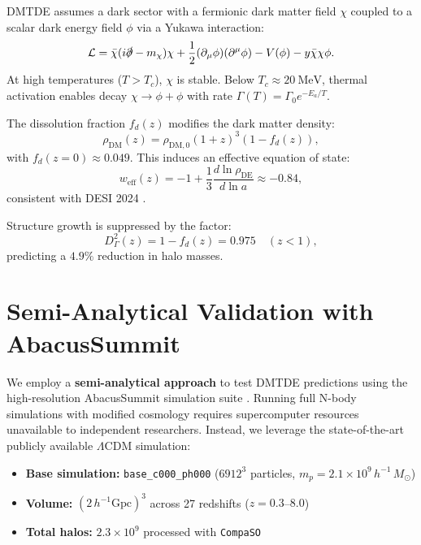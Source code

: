 \documentclass[aps,prd,twocolumn,superscriptaddress,nofootinbib,floatfix,preprintnumbers]{revtex4-2}
\newcommand{\DMTDE}{\textsc{DMTDE}\xspace}
\newcommand{\LCDM}{\ensuremath{\Lambda\text{CDM}}\xspace}
\newcommand{\Msun}{\ensuremath{M_\odot}\xspace}
\begin{document}
\DMTDE assumes a dark sector with a fermionic dark matter field $\chi$ coupled to a scalar dark energy field $\phi$ via a Yukawa interaction:
\begin{equation}
\mathcal{L} = \bar{\chi}(i\slashed{\partial} - m_\chi)\chi + \frac{1}{2}(\partial_\mu\phi)(\partial^\mu\phi) - V(\phi) - y\bar{\chi}\chi\phi.
\end{equation}
At high temperatures ($T > T_c$), $\chi$ is stable. Below $T_c \approx \SI{20}{\MeV}$, thermal activation enables decay $\chi \to \phi + \phi$ with rate $\Gamma(T) = \Gamma_0 e^{-E_a/T}$.

The dissolution fraction $f_d(z)$ modifies the dark matter density:
\begin{equation}
\rho_\mathrm{DM}(z) = \rho_\mathrm{DM,0} (1+z)^3 (1 - f_d(z)),
\end{equation}
with $f_d(z=0) \approx 0.049$. This induces an effective equation of state:
\begin{equation}
w_{\mathrm{eff}}(z) = -1 + \frac{1}{3}\frac{d \ln \rho_\mathrm{DE}}{d \ln a} \approx -0.84,
\end{equation}
consistent with DESI 2024 \citep{DESI2024}.

Structure growth is suppressed by the factor:
\begin{equation}
D_\Gamma^2(z) = 1 - f_d(z) = 0.975 \quad (z < 1),
\end{equation}
predicting a $4.9\%$ reduction in halo masses.

\newpage
\section{Semi-Analytical Validation with AbacusSummit}
\label{sec:abacus}

We employ a \textbf{semi-analytical approach} to test DMTDE predictions using the high-resolution AbacusSummit simulation suite \citep{garrison2021}. Running full N-body simulations with modified cosmology requires supercomputer resources unavailable to independent researchers. Instead, we leverage the state-of-the-art publicly available \LCDM simulation:

\begin{itemize}
\item \textbf{Base simulation:} \texttt{base\_c000\_ph000} ($6912^3$ particles, $m_p = 2.1 \times 10^9\,h^{-1}\,\Msun$)
\item \textbf{Volume:} $(2\,h^{-1}\mathrm{Gpc})^3$ across 27 redshifts ($z = 0.3$--$8.0$)
\item \textbf{Total halos:} $2.3 \times 10^9$ processed with \texttt{CompaSO} \citep{garrison2021}
\end{itemize}
\end{document}
